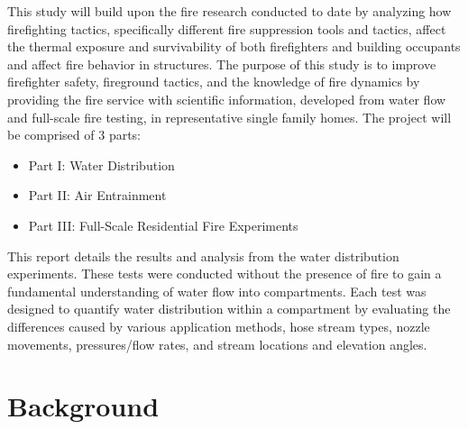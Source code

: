\documentclass[12pt,oneside]{book}
\begin{document}
This study will build upon the fire research conducted to date by analyzing how firefighting tactics, specifically different fire suppression tools and tactics, affect the thermal exposure and survivability of both firefighters and building occupants and affect fire behavior in structures. The purpose of this study is to improve firefighter safety, fireground tactics, and the knowledge of fire dynamics by providing the fire service with scientific information, developed from water flow and full-scale fire testing, in representative single family homes. The project will be comprised of 3 parts:

\begin{itemize}
	\setlength{\itemindent}{0.25in}
	\item Part I:  Water Distribution
	\item Part II: Air Entrainment
	\item Part III: Full-Scale Residential Fire Experiments
	\end{itemize}

This report details the results and analysis from the water distribution experiments. These tests were conducted without the presence of fire to gain a fundamental understanding of water flow into compartments. Each test was designed to quantify water distribution within a compartment by evaluating the differences caused by various application methods, hose stream types, nozzle movements, pressures/flow rates, and stream locations and elevation angles. 


\chapter{Background}
\end{document}
